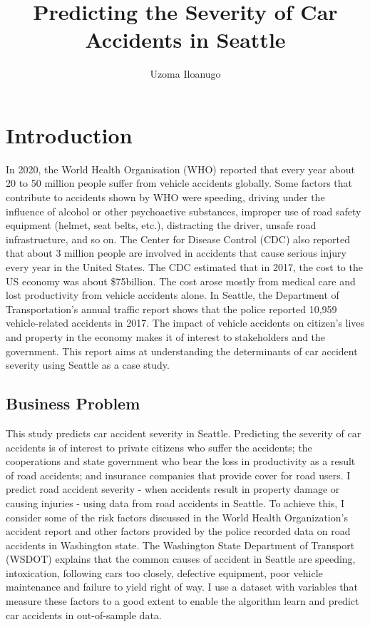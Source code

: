 \documentclass[a4paper,12pt]{article}
\author{Uzoma Iloanugo}
\title{Predicting the Severity of Car Accidents in Seattle}
\begin{document}
\maketitle

\section{Introduction}
In 2020, the World Health Organisation (WHO) reported that every year about 20 to 50 million people suffer from vehicle accidents globally. Some factors that contribute to accidents shown by WHO were speeding, driving under the influence of alcohol or other psychoactive substances, improper use of road safety equipment (helmet, seat belts, etc.), distracting the driver, unsafe road infrastructure, and so on. The Center for Disease Control (CDC) also reported that about 3 million people are involved in accidents that cause serious injury every year in the United States. The CDC estimated that in 2017, the cost to the US economy was about \$75billion. The cost arose mostly from medical care and lost productivity from vehicle accidents alone. In Seattle, the Department of Transportation's annual traffic report shows that the police reported 10,959 vehicle-related accidents in 2017. The impact of vehicle accidents on citizen's lives and property in the economy makes it of interest to stakeholders and the government. This report aims at understanding the determinants of car accident severity using Seattle as a case study.

\subsection{Business Problem}
This study predicts car accident severity in Seattle. Predicting the severity of car accidents is of interest to private citizens who suffer the accidents; the cooperations and state government who bear the loss in productivity as a result of road accidents; and insurance companies that provide cover for road users. I predict road accident severity - when accidents result in property damage or causing injuries - using data from road accidents in Seattle. To achieve this, I consider some of the risk factors discussed in the World Health Organization's accident report and other factors provided by the police recorded data on road accidents in Washington state. The Washington State Department of Transport (WSDOT) explains that the common causes of accident in Seattle are speeding, intoxication, following cars too closely, defective equipment, poor vehicle maintenance and failure to yield right of way. I use a dataset with variables that measure these factors to a good extent to enable the algorithm learn and predict car accidents in out-of-sample data. \\
\end{document}
